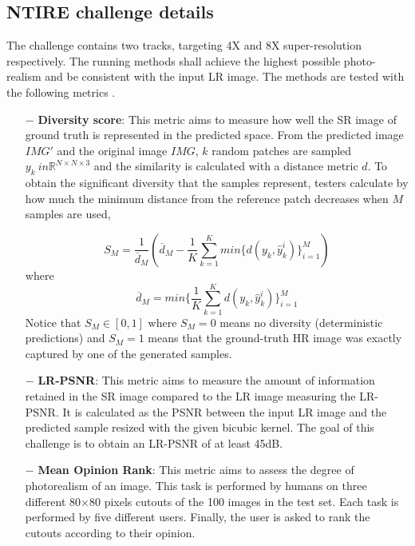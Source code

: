 \documentclass{article}
\begin{document}
\subsection{NTIRE challenge details}
The challenge contains two tracks, targeting 4X and 8X super-resolution respectively. The running methods shall achieve the highest possible photo-realism and be consistent with the input LR image. The methods are tested with the following metrics \cite{ntire21}. %
\begin{itemize}
    \item[$-$] \textbf{Diversity score}: This metric aims to measure how well the SR image of ground truth is represented in the predicted space. From the predicted image $IMG'$ and the original image $IMG$, $k$ random patches are sampled $y_k \ in \mathbb{R}^{N \times N \times 3}$ and the similarity is calculated with a distance metric $d$.  To obtain the significant diversity that the samples represent, testers calculate by how much the minimum distance from the reference patch decreases when $M$ samples are used,

    \begin{equation}
        S_M = \frac{1}{\overline{d}_M}(\overline{d}_M - \frac{1}{K}\sum^K_{k=1} min\{d(y_k, \hat{y}_k^i)\}^M_{i=1})
    \end{equation}
    where 
    \begin{equation}
        \overline{d}_M = min \{\frac{1}{K}\sum^K_{k=1}d(y_k, \hat{y}_k^i)\}^M_{i=1}
    \end{equation}
    Notice that $S_M \in [0,1]$ where $S_M=0$ means no diversity (deterministic predictions) and $S_M=1$ means
    that the ground-truth HR image was exactly captured by one of the generated samples.

    \item[$-$] \textbf{LR-PSNR}: This metric aims to measure the amount of information retained in the SR image compared to the LR image measuring the LR-PSNR. It is calculated as the PSNR between the input LR image and the predicted sample resized with the given bicubic kernel. The goal of this challenge is to obtain an LR-PSNR of at least 45dB.

    \item[$-$] \textbf{Mean Opinion Rank}: This metric aims to assess the degree of photorealism of an image. This task is performed by humans on three different 80$\times$80 pixels cutouts of the 100 images in the test set. Each task is performed by five different users. Finally, the user is asked to rank the cutouts according to their opinion.
\end{itemize}
\end{document}
